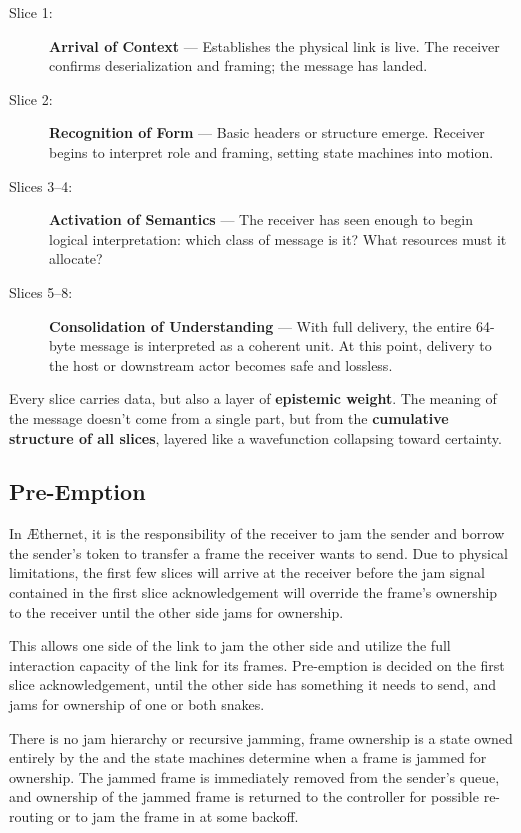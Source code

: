 \documentclass[../../../OAE-SPEC-MAIN.tex]{subfiles}
\begin{document}
\begin{description}
  \item [Slice 1:] \textbf{Arrival of Context} — Establishes the physical link is live. The receiver confirms deserialization and framing; the message has landed.

  \item [Slice 2:] \textbf{Recognition of Form} — Basic headers or structure emerge. Receiver begins to interpret role and framing, setting state machines into motion.

  \item [Slices 3–4:] \textbf{Activation of Semantics} — The receiver has seen enough to begin logical interpretation: which class of message is it? What resources must it allocate?

  \item [Slices 5–8:] \textbf{Consolidation of Understanding} — With full delivery, the entire 64-byte message is interpreted as a coherent unit. At this point, delivery to the host or downstream actor becomes safe and lossless.

\end{description}

Every slice carries data, but also a layer of \textbf{epistemic weight}. The meaning of the message doesn't come from a single part, but from the \textbf{cumulative structure of all slices}, layered like a wavefunction collapsing toward certainty.



\subsection{Pre-Emption}

In \AE thernet, it is the responsibility of the receiver to jam the sender and borrow the sender's token to transfer a frame the receiver wants to send. Due to physical limitations, the first few slices will arrive at the receiver before the jam signal contained in the first slice acknowledgement will override the frame's ownership to the receiver until the other side jams for ownership.

This allows one side of the link to jam the other side and utilize the full interaction capacity of the link for its frames. Pre-emption is decided on the first slice acknowledgement, until the other side has something it needs to send, and jams for ownership of one or both snakes. 

There is no jam hierarchy or recursive jamming, frame ownership is a state owned entirely by the \LINK and the \LINK state machines determine when a frame is jammed for ownership. The jammed frame is immediately removed from the sender's queue, and ownership of the jammed frame is returned to the controller for possible re-routing or to jam the frame in at some backoff.
\end{document}
